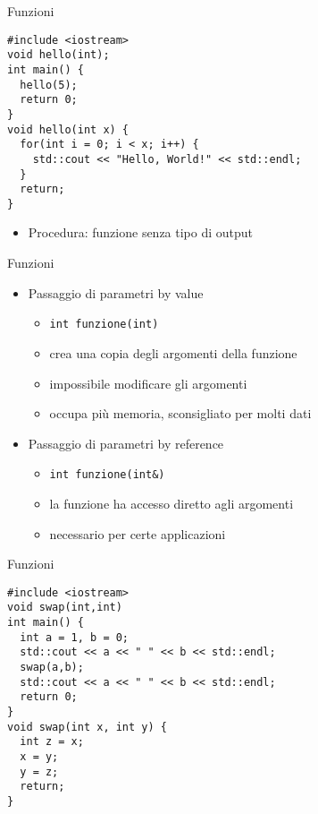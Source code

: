 \begin{frame}[fragile]{Funzioni}
  \vfill
  \begin{lstlisting}
#include <iostream>
void hello(int);
int main() {
  hello(5);
  return 0;
}
void hello(int x) {
  for(int i = 0; i < x; i++) {
    std::cout << "Hello, World!" << std::endl;
  }
  return;
}
  \end{lstlisting}
  \vfill
  \begin{itemize}
    \item \alert{Procedura}: funzione senza tipo di output
  \end{itemize}
  \vfill
\end{frame}

\begin{frame}[fragile]{Funzioni}
  \vfill
  \begin{itemize}
    \item Passaggio di parametri \alert{by value}
    \begin{itemize}
      \item \lstinline$int funzione(int)$
      \item crea una copia degli argomenti della funzione
      \item impossibile modificare gli argomenti
      \item occupa più memoria, sconsigliato per molti dati
    \end{itemize}
    \vfill
    \item Passaggio di parametri \alert{by reference}
    \begin{itemize}
      \item \lstinline$int funzione(int&)$
      \item la funzione ha accesso diretto agli argomenti
      \item necessario per certe applicazioni
    \end{itemize}
  \end{itemize}
  \vfill
\end{frame}

\begin{frame}[fragile]{Funzioni}
  \vfill
  \begin{lstlisting}
#include <iostream>
void swap(int,int)
int main() {
  int a = 1, b = 0;
  std::cout << a << " " << b << std::endl;
  swap(a,b);
  std::cout << a << " " << b << std::endl;
  return 0;
}
void swap(int x, int y) {
  int z = x;
  x = y;
  y = z;
  return;
}
  \end{lstlisting}
  \vfill
\end{frame}

